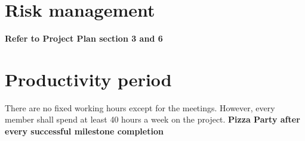 \documentclass{article}
\begin{document}
	\section{Risk management}
		\textbf{Refer to Project Plan section 3 and 6}
	\section{Productivity period}
		There are no fixed working hours except for the meetings. However, every member shall spend at least 40 hours a week on the project.
		\textbf{Pizza Party after every successful milestone completion}
\end{document}
